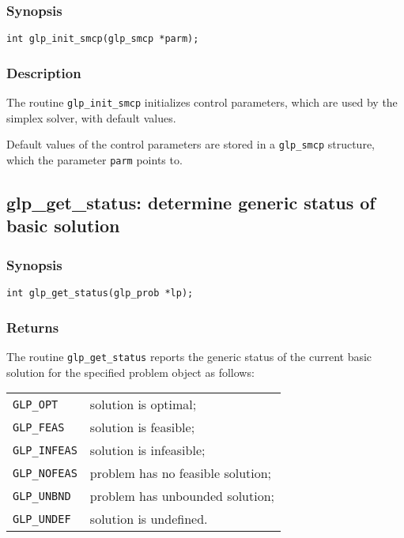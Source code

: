 \subsubsection*{Synopsis}

\begin{verbatim}
int glp_init_smcp(glp_smcp *parm);
\end{verbatim}

\subsubsection*{Description}

The routine \verb|glp_init_smcp| initializes control parameters, which
are used by the simplex solver, with default values.

Default values of the control parameters are stored in a \verb|glp_smcp|
structure, which the parameter \verb|parm| points to.

\subsection{glp\_get\_status: determine generic status of basic
solution}

\subsubsection*{Synopsis}

\begin{verbatim}
int glp_get_status(glp_prob *lp);
\end{verbatim}

\subsubsection*{Returns}

The routine \verb|glp_get_status| reports the generic status of the
current basic solution for the specified problem object as follows:

\begin{tabular}{@{}ll}
\verb|GLP_OPT|    & solution is optimal; \\
\verb|GLP_FEAS|   & solution is feasible; \\
\verb|GLP_INFEAS| & solution is infeasible; \\
\verb|GLP_NOFEAS| & problem has no feasible solution; \\
\verb|GLP_UNBND|  & problem has unbounded solution; \\
\verb|GLP_UNDEF|  & solution is undefined. \\
\end{tabular}

